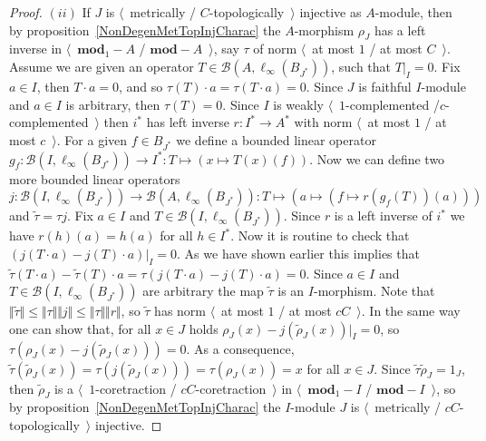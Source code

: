 \begin{proof}
$(ii)$ If $J$ is $\langle$~metrically / $C$-topologically~$\rangle$ injective as
$A$-module, then by proposition~\ref{NonDegenMetTopInjCharac} the $A$-morphism
$\rho_J$ has a left inverse in $\langle$~$\mathbf{mod}_1-A$ /
$\mathbf{mod}-A$~$\rangle$, say $\tau $ of norm $\langle$~at most $1$ / at most
$C$~$\rangle$. Assume we are given an operator $T\in
\mathcal{B}(A,\ell_\infty(B_{J^*}))$, such that $T|_I=0$. Fix $a\in I$, then
$T\cdot a=0$, and so $\tau (T)\cdot a=\tau (T\cdot a)=0$. Since $J$ is faithful
$I$-module and $a\in I$ is arbitrary, then $\tau (T)=0$. Since $I$ is weakly 
$\langle$~$1$-complemented /$c$-complemented~$\rangle$ then $i^*$ has left 
inverse $r:I^*\to A^*$ with norm $\langle$~at most $1$ / at most $c$~$\rangle$.
For a given $f\in B_{J^*}$ we define a bounded linear operator 
$g_f:\mathcal{B}(I,\ell_\infty(B_{J^*}))\to I^*:T\mapsto(x\mapsto T(x)(f))$. 
Now we can define two more bounded linear operators
$$
j
:\mathcal{B}(I,\ell_\infty(B_{J^*}))\to \mathcal{B}(A,\ell_\infty(B_{J^*}))
:T\mapsto (a\mapsto (f\mapsto r(g_{f}(T))(a)))
$$ 
and $\widetilde{\tau}=\tau  j$. Fix $a\in I$ 
and $T\in\mathcal{B}(I,\ell_\infty(B_{J^*}))$. Since $r$ is a left inverse 
of $i^*$ we have $r(h)(a)=h(a)$ for all $h\in I^*$. Now it is routine to check 
that $(j(T\cdot a)-j(T)\cdot a)|_I=0$. As we have shown earlier this implies
that $\widetilde{\tau}(T\cdot a)-\widetilde{\tau}(T)\cdot a
=\tau (j(T\cdot a)-j(T)\cdot a)=0$. Since $a\in I$ 
and $T\in\mathcal{B}(I,\ell_\infty(B_{J^*}))$ are arbitrary the 
map $\widetilde{\tau}$ is an $I$-morphism.
Note that 
$\Vert\widetilde{\tau}\Vert\leq\Vert\tau \Vert\Vert j\Vert\leq \Vert
\tau\Vert\Vert r\Vert$, so $\widetilde{\tau}$ has 
norm $\langle$~at most $1$ / at most $cC$~$\rangle$.
In the same way one can show that, for all $x\in J$ 
holds $\rho_J(x)-j(\widetilde{\rho}_J(x))|_I=0$,
so $\tau (\rho_J(x)-j(\widetilde{\rho}_J(x)))=0$. As a consequence,
$\widetilde{\tau}(\widetilde{\rho}_J(x))
=\tau (j(\widetilde{\rho}_J(x)))=\tau(\rho_J(x))=x$ 
for all $x\in J$. Since $\widetilde{\tau}\widetilde{\rho}_J=1_J$,
then $\widetilde{\rho}_J$ is a  $\langle$~$1$-coretraction /
$cC$-coretraction~$\rangle$ in $\langle$~$\mathbf{mod}_1-I$ /
$\mathbf{mod}-I$~$\rangle$, so by proposition~\ref{NonDegenMetTopInjCharac} the
$I$-module $J$ is $\langle$~metrically / $cC$-topologically~$\rangle$ injective.
\end{proof}


